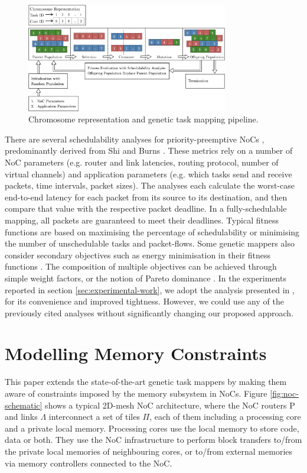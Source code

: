 \documentclass[10pt,conference]{IEEEtran}
\begin{document}
\vspace{-0.5ex}
\begin{figure}[!ht]
  \centering
  \includegraphics*[width=8.8cm,keepaspectratio]{fig/ga-pipeline}
  \caption{Chromosome representation and genetic task mapping pipeline.}
  \label{fig:ga-pipeline}
\end{figure}
\vspace{-0.5ex}

There are several schedulability analyses for priority-preemptive NoCs \cite{Kashif15, Indrusiak16, Xiong17}, predominantly derived from Shi and Burns \cite{Shi08}. These metrics rely on a number of NoC parameters (e.g. router and link latencies, routing protocol, number of virtual channels) and application parameters (e.g. which tasks send and receive packets, time intervals, packet sizes). The analyses each calculate the worst-case end-to-end latency for each packet from its source to its destination, and then compare that value with the respective packet deadline. In a fully-schedulable mapping, all packets are guaranteed to meet their deadlines. Typical fitness functions are based on maximising the percentage of schedulability or minimising the number of unschedulable tasks and packet-flows. Some genetic mappers also consider secondary objectives such as energy minimisation in their fitness functions \cite{Sayuti13}. The composition of multiple objectives can be achieved through simple weight factors, or the notion of Pareto dominance \cite{Deb02}. In the experiments reported in section \ref{sec:experimental-work}, we adopt the analysis presented in \cite{Indrusiak16}, for its convenience and improved tightness. However, we could use any of the previously cited analyses without significantly changing our proposed approach.

\section{Modelling Memory Constraints}\label{sec:modelling-memory-constraints}

This paper extends the state-of-the-art genetic task mappers by making them aware of constraints imposed by the memory subsystem in NoCs. Figure \ref{fig:noc-schematic} shows a typical 2D-mesh NoC architecture, where the NoC routers $\mathrm{P}$ and links $\Lambda$ interconnect a set of tiles $\Pi$, each of them including a processing core and a private local memory. Processing cores use the local memory to store code, data or both. They use the NoC infrastructure to perform block transfers to/from the private local memories of neighbouring cores, or to/from external memories via memory controllers connected to the NoC.
\end{document}
